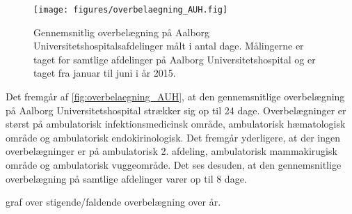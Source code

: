 \begin{figure}[H]
\centering
\texttt{[image: figures/overbelaegning\_AUH.fig]}
\caption{Gennemsnitlig overbelægning på Aalborg Universitetshospitalsafdelinger målt i antal dage. Målingerne er taget for samtlige afdelinger på Aalborg Universitetshospital og er taget fra januar til juni i år 2015.\citep{SDS2015} }
\label{fig:overbelaegning_AUH}
\end{figure}

\noindent
Det fremgår af \autoref{fig:overbelaegning_AUH}, at den gennemsnitlige overbelægning på Aalborg Universitetshospital strækker sig op til 24 dage.  Overbelægninger er størst på ambulatorisk infektionsmedicinsk område, ambulatorisk hæmatologisk område og ambulatorisk endokirinologisk. Det fremgår yderligere, at der ingen overbelægninger er på ambulatorisk 2. afdeling, ambulatorisk mammakirugisk  område og ambulatorisk vuggeområde. Det ses desuden, at den gennemsnitlige overbelægning på samtlige afdelinger varer op til 8 dage. 

graf over stigende/faldende overbelægning over år. 




